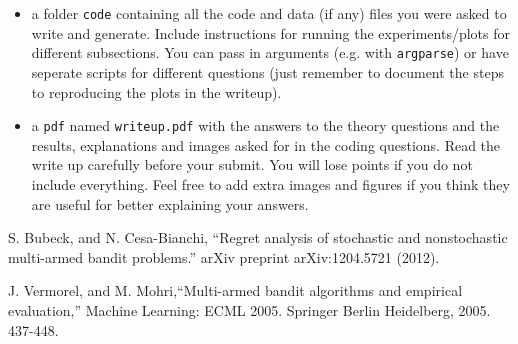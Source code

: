 \documentclass{article}
\begin{document}
\begin{itemize}
    \item a folder {\tt code} containing all the code and data (if any) files you were asked to write and generate. Include instructions for running the experiments/plots for different subsections. You can pass in arguments (e.g. with {\tt argparse}) or have seperate scripts for different questions (just remember to document the steps to reproducing the plots in the writeup). %

    \item a \texttt{pdf} named {\tt writeup.pdf} with the answers to the theory questions and the results, explanations and images asked for in the coding questions. Read the write up carefully before your submit. You will lose points if you do not include everything. Feel free to add extra images and figures if you think they are useful for better explaining your answers.

\end{itemize}

\begin{thebibliography}{10}

S. Bubeck, and N. Cesa-Bianchi, ``Regret analysis of stochastic and nonstochastic multi-armed bandit problems.'' arXiv preprint arXiv:1204.5721 (2012).
    
J. Vermorel, and M. Mohri,``Multi-armed bandit algorithms and empirical evaluation,'' Machine Learning: ECML 2005. Springer Berlin Heidelberg, 2005. 437-448.
\end{thebibliography}
\end{document}
